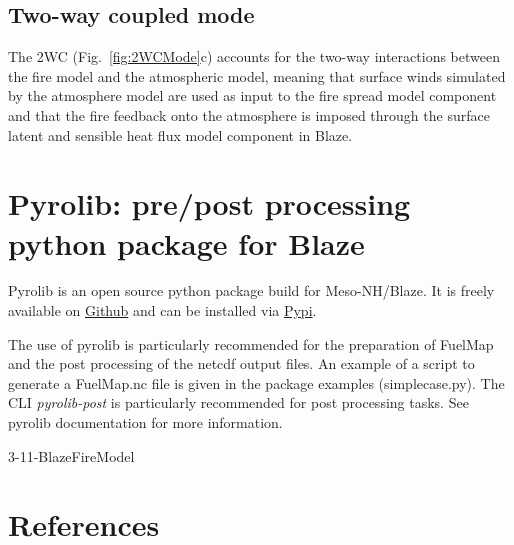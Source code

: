 \subsection{Two-way coupled mode}
\label{ssec:cpl12WC}

The 2WC (Fig.~\ref{fig:2WCMode}c) accounts for the two-way interactions between the fire model and the atmospheric model, meaning that surface winds simulated by the atmosphere model are used as input to the fire spread model component and that the fire feedback onto the atmosphere is imposed through the surface latent and sensible heat flux model component in Blaze.

\section{Pyrolib: pre/post processing python package for Blaze}

Pyrolib is an open source python package build for Meso-NH/Blaze.
It is freely available on \href{https://github.com/Aurel31/pyrolib}{Github} and can be installed via \href{https://pypi.org/project/pyrolib}{Pypi}. 

The use of pyrolib is particularly recommended for the preparation of FuelMap and the post processing of the netcdf output files.
An example of a script to generate a FuelMap.nc file is given in the package examples (simplecase.py).
The CLI \textit{pyrolib-post} is particularly recommended for post processing tasks. See pyrolib documentation for more information.  






\begin{btSect}{3-11-BlazeFireModel}
\section{References}
\btPrintCited
\end{btSect}
